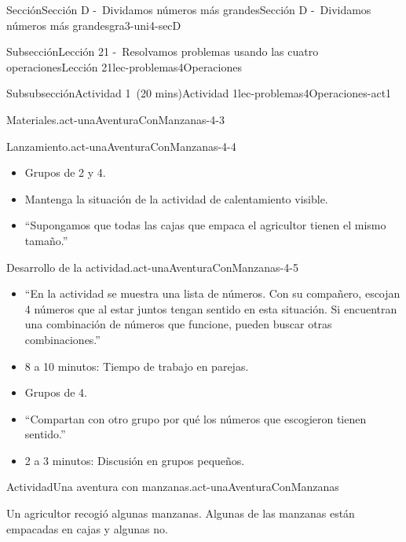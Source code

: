\documentclass[oneside,10pt,]{article}
\begin{document}
\begin{sectionptx}{Sección}{Sección D -~Dividamos números más grandes}{}{Sección D -~Dividamos números más grandes}{}{}{gra3-uni4-secD}
\begin{subsectionptx}{Subsección}{Lección 21 -~Resolvamos problemas usando las cuatro operaciones}{}{Lección 21}{}{}{lec-problemas4Operaciones}
\begin{subsubsectionptx}{Subsubsección}{Actividad 1~(20 mins)}{}{Actividad 1}{}{}{lec-problemas4Operaciones-act1}
\begin{paragraphs}{Materiales.}{act-unaAventuraConManzanas-4-3}
\begin{itemize}[label=\textbullet]
\end{itemize}
\end{paragraphs}%
\begin{paragraphs}{Lanzamiento.}{act-unaAventuraConManzanas-4-4}%
%
\begin{itemize}[label=\textbullet]
\item{}Grupos de 2 y 4.%
\item{}Mantenga la situación de la actividad de calentamiento visible.%
\item{}``Supongamos que todas las cajas que empaca el agricultor tienen el mismo tamaño.''%
\end{itemize}
\end{paragraphs}%
\begin{paragraphs}{Desarrollo de la actividad.}{act-unaAventuraConManzanas-4-5}%
%
\begin{itemize}[label=\textbullet]
\item{}``En la actividad se muestra una lista de números. Con su compañero, escojan 4 números que al estar juntos tengan sentido en esta situación. Si encuentran una combinación de números que funcione, pueden buscar otras combinaciones.''%
\item{}8 a 10 minutos: Tiempo de trabajo en parejas.%
\item{}Grupos de 4.%
\item{}``Compartan con otro grupo por qué los números que escogieron tienen sentido.''%
\item{}2 a 3 minutos: Discusión en grupos pequeños.%
\end{itemize}
\end{paragraphs}%
\begin{activity}{Actividad}{Una aventura con manzanas.}{act-unaAventuraConManzanas}%
\begin{sidebyside}{2}{0}{0}{0.1}%
\begin{sbspanel}{0.6}%
Un agricultor recogió algunas manzanas. Algunas de las manzanas están empacadas en cajas y algunas no.%
\end{sbspanel}%
\begin{sbspanel}{0.3}%

\end{sbspanel}
\end{sidebyside}
\end{activity}
\end{subsubsectionptx}
\end{subsectionptx}
\end{sectionptx}
\end{document}
